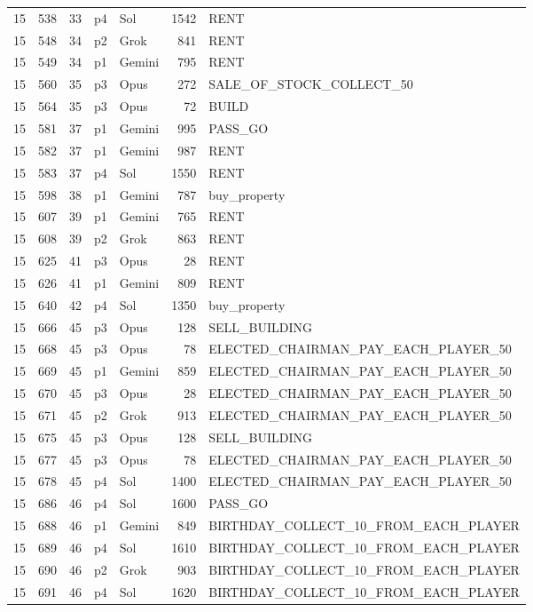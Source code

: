 \begin{longtable}{r r r l l r >{\ttfamily}l}
15 & 538 & 33 & p4 & Sol & 1542 & RENT \\
15 & 548 & 34 & p2 & Grok & 841 & RENT \\
15 & 549 & 34 & p1 & Gemini & 795 & RENT \\
15 & 560 & 35 & p3 & Opus & 272 & SALE\_OF\_STOCK\_COLLECT\_50 \\
15 & 564 & 35 & p3 & Opus & 72 & BUILD \\
15 & 581 & 37 & p1 & Gemini & 995 & PASS\_GO \\
15 & 582 & 37 & p1 & Gemini & 987 & RENT \\
15 & 583 & 37 & p4 & Sol & 1550 & RENT \\
15 & 598 & 38 & p1 & Gemini & 787 & buy\_property \\
15 & 607 & 39 & p1 & Gemini & 765 & RENT \\
15 & 608 & 39 & p2 & Grok & 863 & RENT \\
15 & 625 & 41 & p3 & Opus & 28 & RENT \\
15 & 626 & 41 & p1 & Gemini & 809 & RENT \\
15 & 640 & 42 & p4 & Sol & 1350 & buy\_property \\
15 & 666 & 45 & p3 & Opus & 128 & SELL\_BUILDING \\
15 & 668 & 45 & p3 & Opus & 78 & ELECTED\_CHAIRMAN\_PAY\_EACH\_PLAYER\_50 \\
15 & 669 & 45 & p1 & Gemini & 859 & ELECTED\_CHAIRMAN\_PAY\_EACH\_PLAYER\_50 \\
15 & 670 & 45 & p3 & Opus & 28 & ELECTED\_CHAIRMAN\_PAY\_EACH\_PLAYER\_50 \\
15 & 671 & 45 & p2 & Grok & 913 & ELECTED\_CHAIRMAN\_PAY\_EACH\_PLAYER\_50 \\
15 & 675 & 45 & p3 & Opus & 128 & SELL\_BUILDING \\
15 & 677 & 45 & p3 & Opus & 78 & ELECTED\_CHAIRMAN\_PAY\_EACH\_PLAYER\_50 \\
15 & 678 & 45 & p4 & Sol & 1400 & ELECTED\_CHAIRMAN\_PAY\_EACH\_PLAYER\_50 \\
15 & 686 & 46 & p4 & Sol & 1600 & PASS\_GO \\
15 & 688 & 46 & p1 & Gemini & 849 & BIRTHDAY\_COLLECT\_10\_FROM\_EACH\_PLAYER \\
15 & 689 & 46 & p4 & Sol & 1610 & BIRTHDAY\_COLLECT\_10\_FROM\_EACH\_PLAYER \\
15 & 690 & 46 & p2 & Grok & 903 & BIRTHDAY\_COLLECT\_10\_FROM\_EACH\_PLAYER \\
15 & 691 & 46 & p4 & Sol & 1620 & BIRTHDAY\_COLLECT\_10\_FROM\_EACH\_PLAYER \\

\end{longtable}
